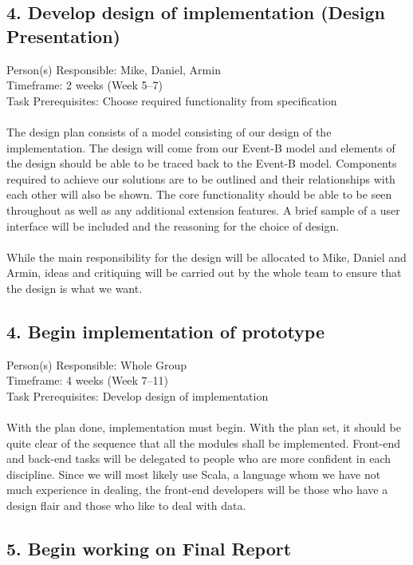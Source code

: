 \subsection{4. Develop design of implementation (Design Presentation)}
\label{developdesignofimplementationdesignpresentation}

Person(s) Responsible: Mike, Daniel, Armin
 \\ Timeframe: 2 weeks (Week 5--7)
 \\ Task Prerequisites: Choose required functionality from specification
 \\ \\ The design plan consists of a model consisting of our design of the implementation. The design will come from our Event-B model and elements of the design should be able to be traced back to the Event-B model. Components required to achieve our solutions are to be outlined and their relationships with each other will also be shown. The core functionality should be able to be seen throughout as well as any additional extension features. A brief sample of a user interface will be included and the reasoning for the choice of design.
 \\ \\ While the main responsibility for the design will be allocated to Mike, Daniel and Armin, ideas and critiquing will be carried out by the whole team to ensure that the design is what we want.

\subsection{4. Begin implementation of prototype}
\label{beginimplementationofprototype}

Person(s) Responsible: Whole Group
 \\ Timeframe: 4 weeks (Week 7--11)
 \\ Task Prerequisites: Develop design of implementation
 \\ \\ With the plan done, implementation must begin. With the plan set, it should be quite clear of the sequence that all the modules shall be implemented. Front-end and back-end tasks will be delegated to people who are more confident in each discipline. Since we will most likely use Scala, a language whom we have not much experience in dealing, the front-end developers will be those who have a design flair and those who like to deal with data. 

\subsection{5. Begin working on Final Report}
\label{beginworkingonfinalreport}

